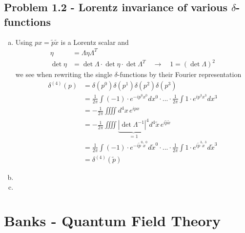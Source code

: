 \documentclass[../main.tex]{subfiles}
\begin{document}
\subsection{Problem 1.2 - Lorentz invariance of various $\delta$-functions}
\begin{enumerate}[(a)]
\item Using $px=\tilde{p}\tilde{x}$ is a Lorentz scalar and 
\begin{align}
\eta
&=\Lambda\eta\Lambda^T\\
\det\eta
&=\det\Lambda\cdot\det\eta\cdot\det\Lambda^T\quad
\rightarrow\quad 1=(\det\Lambda)^2
\end{align}
we see when rewriting the single $\delta$-functions by their Fourier representation
\begin{align}
\delta^{(4)}(p)
&=\delta(p^0)\delta(p^1)\delta(p^2)\delta(p^3)\\
&=\frac{1}{2\pi}\int (-1)\cdot e^{-ip^0x^0}dx^0\cdot ...\cdot\frac{1}{2\pi}\int 1\cdot e^{ip^3x^3}dx^3\\
&=-\frac{1}{2\pi}\iiiint d^4x\, e^{ipx}\\
&=-\frac{1}{2\pi}\iiiint \underbrace{|\det\Lambda^{-1}|^4}_{=1}d^4\tilde{x}\, e^{i\tilde{p}\tilde{x}}\\
&=\frac{1}{2\pi}\int (-1)\cdot e^{-i\tilde{p}^0\tilde{x}^0}d\tilde{x}^0\cdot ...\cdot\frac{1}{2\pi}\int 1\cdot e^{i\tilde{p}^3\tilde{x}^3}d\tilde{x}^3\\
&=\delta^{(4)}(\tilde{p})
\end{align}

\item 
\item 

\end{enumerate}




\newpage
\section{{\sc Banks} - Quantum Field Theory}
\end{document}
